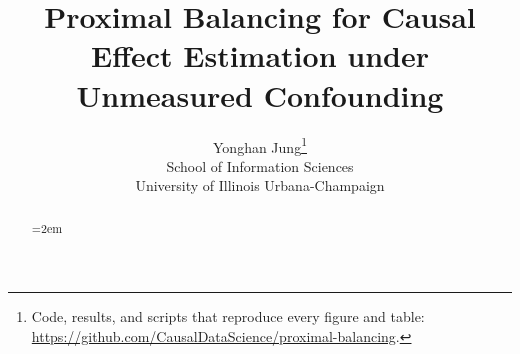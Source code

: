 \documentclass[letterpaper,11pt]{scrartcl}
\title{Proximal Balancing for Causal Effect Estimation under Unmeasured Confounding}
\author{Yonghan Jung\thanks{Code, results, and scripts that reproduce every figure and table: \url{https://github.com/CausalDataScience/proximal-balancing}.}\\[0.3em]\normalsize School of Information Sciences\\\normalsize University of Illinois Urbana-Champaign}
\date{}
\begin{document}
\maketitle
\allowdisplaybreaks

\begin{abstract}
\emergencystretch=2em

\end{abstract}

\tableofcontents
\newpage

\begingroup
\allowdisplaybreaks
\sloppy






\endgroup





\begingroup
\allowdisplaybreaks
\sloppy





\endgroup
\end{document}
